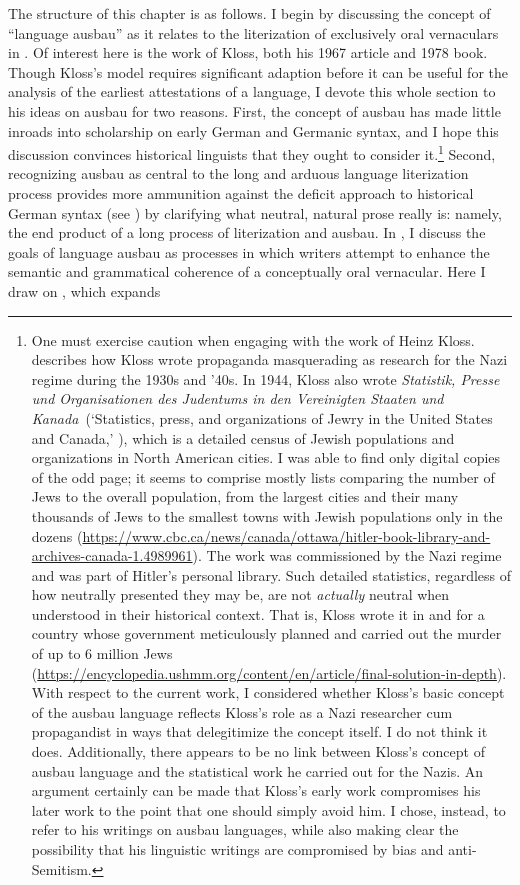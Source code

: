   The structure of this chapter is as follows. I begin by discussing the concept of “language ausbau” as it relates to the literization of exclusively oral vernaculars in . Of interest here is the work of Kloss, both his 1967 article and 1978 book. Though Kloss’s model requires significant adaption before it can be useful for the analysis of the earliest attestations of a language, I devote this whole section to his ideas on ausbau for two reasons. First, the concept of ausbau has made little inroads into scholarship on early German and Germanic syntax, and I hope this discussion convinces historical linguists that they ought to consider it.\footnote{\textrm{One must exercise caution when engaging with the work of Heinz Kloss. \citet{Wilhelm2002} describes how Kloss wrote propaganda masquerading as research for the Nazi regime during the 1930s and '40s. In 1944, Kloss also wrote} \textrm{\textit{Statistik, Presse und Organisationen des Judentums in den Vereinigten Staaten und Kanada~}}\textrm{(‘Statistics, press, and organizations of Jewry in the United States and Canada,' \citealt{Kloss1944}), which is a detailed census of Jewish populations and organizations in North American cities. I was able to find only digital copies of the odd page; it seems to comprise mostly lists comparing the number of Jews to the overall population, from the largest cities and their many thousands of Jews to the smallest towns with Jewish populations only in the dozens (}\url{https://www.cbc.ca/news/canada/ottawa/hitler-book-library-and-archives-canada-1.4989961}{)}\textrm{. The work was commissioned by the Nazi regime and was part of Hitler’s personal library. Such detailed statistics, regardless of how neutrally presented they may be, are not} \textrm{\textit{actually}} \textrm{neutral when understood in their historical context. That is, Kloss wrote it in and for a country whose government meticulously planned and carried out the murder of up to 6 million Jews (}\url{https://encyclopedia.ushmm.org/content/en/article/final-solution-in-depth}\textrm{). With respect to the current work, I considered whether Kloss’s basic concept of the ausbau language reflects Kloss’s role as a Nazi researcher cum propagandist in ways that delegitimize the concept itself. I do not think it does. Additionally, there appears to be no link between Kloss’s concept of ausbau language and the statistical work he carried out for the Nazis. An argument certainly can be made that Kloss’s early work compromises his later work to the point that one should simply avoid him. I chose, instead, to refer to his writings on ausbau languages, while also making clear the possibility that his linguistic writings are compromised by bias and anti-Semitism.}} Second, recognizing ausbau as central to the long and arduous language literization process provides more ammunition against the deficit approach to historical German syntax (see ) by clarifying what neutral, natural prose really is: namely, the end product of a long process of literization and ausbau. In , I discuss the goals of language ausbau as processes in which writers attempt to enhance the semantic and grammatical coherence of a conceptually oral vernacular. Here I draw on \citet{KochOesterreicher1994}, which expands 